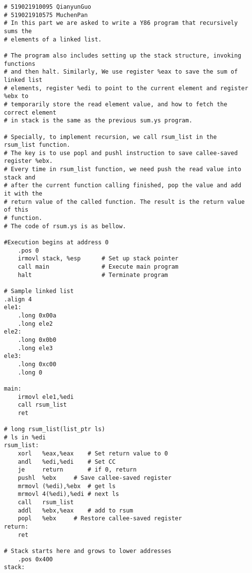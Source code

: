 \documentclass{article}
\begin{document}
\begin{lstlisting}[language={[x86masm]Assembler}]
# 519021910095 QianyunGuo
# 519021910575 MuchenPan
# In this part we are asked to write a Y86 program that recursively sums the 
# elements of a linked list. 

# The program also includes setting up the stack structure, invoking functions 
# and then halt. Similarly, We use register %eax to save the sum of linked list 
# elements, register %edi to point to the current element and register %ebx to 
# temporarily store the read element value, and how to fetch the correct element 
# in stack is the same as the previous sum.ys program. 

# Specially, to implement recursion, we call rsum_list in the rsum_list function. 
# The key is to use popl and pushl instruction to save callee-saved register %ebx. 
# Every time in rsum_list function, we need push the read value into stack and 
# after the current function calling finished, pop the value and add it with the 
# return value of the called function. The result is the return value of this 
# function.
# The code of rsum.ys is as bellow.

#Execution begins at address 0
    .pos 0
    irmovl stack, %esp      # Set up stack pointer
    call main               # Execute main program
    halt                    # Terminate program

# Sample linked list
.align 4
ele1:
	.long 0x00a
	.long ele2
ele2:
	.long 0x0b0
	.long ele3
ele3:
	.long 0xc00
	.long 0

main:
	irmovl ele1,%edi
	call rsum_list
	ret

# long rsum_list(list_ptr ls)
# ls in %edi
rsum_list:
	xorl   %eax,%eax	# Set return value to 0
	andl   %edi,%edi	# Set CC
	je     return		# if 0, return
	pushl  %ebx		# Save callee-saved register
	mrmovl (%edi),%ebx	# get ls
	mrmovl 4(%edi),%edi	# next ls
	call   rsum_list
	addl   %ebx,%eax	# add to rsum
	popl   %ebx		# Restore callee-saved register
return:
	ret

# Stack starts here and grows to lower addresses
	.pos 0x400
stack:

\end{lstlisting}
\end{document}
